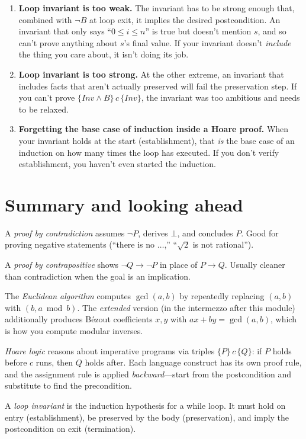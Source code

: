\documentclass[11pt]{article}
\begin{document}
\begin{enumerate}
  \item \textbf{Loop invariant is too weak.} The invariant has to be strong enough that, combined with $\neg B$ at loop exit, it implies the desired postcondition. An invariant that only says ``$0 \leq i \leq n$'' is true but doesn't mention $s$, and so can't prove anything about $s$'s final value. If your invariant doesn't \emph{include} the thing you care about, it isn't doing its job.
  \item \textbf{Loop invariant is too strong.} At the other extreme, an invariant that includes facts that aren't actually preserved will fail the preservation step. If you can't prove $\{Inv \wedge B\}\, c\, \{Inv\}$, the invariant was too ambitious and needs to be relaxed.
  \item \textbf{Forgetting the base case of induction inside a Hoare proof.} When your invariant holds at the start (establishment), that \emph{is} the base case of an induction on how many times the loop has executed. If you don't verify establishment, you haven't even started the induction.
\end{enumerate}

\section{Summary and looking ahead}

\begin{keytakeaway}
  \item A \emph{proof by contradiction} assumes $\lnot P$, derives $\bot$, and concludes $P$. Good for proving negative statements (``there is no $\ldots$,'' ``$\sqrt{2}$ is not rational'').
  \item A \emph{proof by contrapositive} shows $\lnot Q \to \lnot P$ in place of $P \to Q$. Usually cleaner than contradiction when the goal is an implication.
  \item The \emph{Euclidean algorithm} computes $\gcd(a, b)$ by repeatedly replacing $(a, b)$ with $(b, a \bmod b)$. The \emph{extended} version (in the intermezzo after this module) additionally produces B\'ezout coefficients $x, y$ with $a x + b y = \gcd(a,b)$, which is how you compute modular inverses.
  \item \emph{Hoare logic} reasons about imperative programs via triples $\{P\}\, c\, \{Q\}$: if $P$ holds before $c$ runs, then $Q$ holds after. Each language construct has its own proof rule, and the assignment rule is applied \emph{backward}---start from the postcondition and substitute to find the precondition.
  \item A \emph{loop invariant} is the induction hypothesis for a while loop. It must hold on entry (establishment), be preserved by the body (preservation), and imply the postcondition on exit (termination).
\end{keytakeaway}
\end{document}
